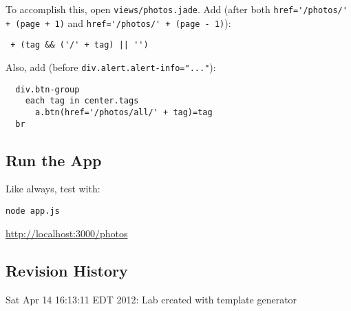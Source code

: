 \documentclass{article}
\begin{document}
To accomplish this, open \verb!views/photos.jade!. Add (after both \verb!href='/photos/' + (page + 1)! and \verb!href='/photos/' + (page - 1)!):

\begin{verbatim}
 + (tag && ('/' + tag) || '')
\end{verbatim}

Also, add (before \verb!div.alert.alert-info="..."!):

\begin{verbatim}
  div.btn-group
    each tag in center.tags
      a.btn(href='/photos/all/' + tag)=tag
  br
\end{verbatim}

\subsection*{Run the App}

Like always, test with:

\begin{itemize*}
\item \verb!node app.js!
\item \href{http://localhost:3000/photos}{http://localhost:3000/photos}
\end{itemize*}



\subsection*{Revision History}
\begin{itemize*}
 \item Sat Apr 14 16:13:11 EDT 2012: Lab created with template generator
\end{itemize*}
\end{document}
